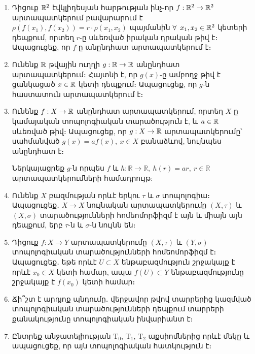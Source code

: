\begin{enumerate}[label=\thesection.\arabic*.]
\begin{hint}
Օգտվեք նախորդ խնդրի ցուցումից։
\end{hint}

\item Դիցուք $\mathbb{R}^2$ էվկլիդեսյան հարթության ինչ-որ $f: \mathbb{R}^2 \to \mathbb{R}^2$ արտապատ\-կե\-րում բավարարում է $\rho\left(f(x_1), f(x_2)\right) = r \cdot \rho(x_1, x_2)$ պայմանին $\forall \ x_1, x_2 \in \R^2$ կետերի դեպքում, որտեղ $r$-ը սևեռված իրական դրական թիվ է։ Ապա\-ցու\-ցեք, որ $f$-ը անընդհատ արտապատկերում է։

\item Ունենք $\mathbb{R}$ թվային ուղղի $g: \mathbb{R} \to \mathbb{R}$ անընդհատ արտապատկերում։ Հայտնի է, որ $g(x)$-ը ամբողջ թիվ է ցանկացած $x \in \mathbb{R}$ կետի դեպքում։ Ապացուցեք, որ $g$-ն հաստատուն արտապատկերում է։

\item Ունենք $f: X \to \mathbb{R}$ անընդհատ արտապատկերում, որտեղ $X$-ը կամայական տոպոլոգիական տարածություն է, և $a \in \mathbb{R}$ սևեռված թիվ։ Ապացուցեք, որ $g: X \to \mathbb{R}$ արտապատկերումը՝ սահմանված $g(x) = a f(x), \ x \in X$ բանաձևով, նույնպես անընդհատ է։

\begin{hint}
Ներկայացրեք $g$-ն որպես $f$ և $h: \mathbb{R} \to \mathbb{R}, \ h(r) = ar, \ r \in \mathbb{R}$ արտապատկերումների համադրույթ:
\end{hint}

\item Ունենք $X$ բազմության որևէ երկու $\tau$ և $\sigma$ տոպոլոգիա։ Ապացուցեք․ $X \to X$ նույնական արտապատկերումը $(X, \tau)$ և $(X, \sigma)$ տարածությունների հոմեոմոր\-ֆիզմ է այն և միայն այն դեպքում, երբ $\tau$-ն և $\sigma$-ն նույնն են։

\item Դիցուք $f: X \to Y$ արտապատկերումը $(X, \tau)$ և $(Y, \sigma)$ տոպոլոգիական տա\-րա\-ծությունների հոմեոմորֆիզմ է։ Ապացուցեք․ եթե որևէ $U \subset X$ ենթաբազմու\-թյուն շրջակայք է որևէ $x_0 \in X$ կետի համար, ապա $f(U) \subset Y$ ենթաբազմու\-թյունը շրջակայք է $f(x_0)$ կետի համար։

\item Ճի՞շտ է արդյոք պնդումը․ վերջավոր թվով տարրերից կազմված տոպոլոգիա\-կան տարածությունների դեպքում տարրերի քանակությունը տոպոլոգիական ինվարիանտ է։

\item Ընտրեք անջատելիության $\textrm{T}_0$, $\textrm{T}_1$, $\textrm{T}_2$ աքսիոմներից որևէ մեկը և ապացուցեք, որ այն տոպոլոգիական հատկություն է։


\end{enumerate}
